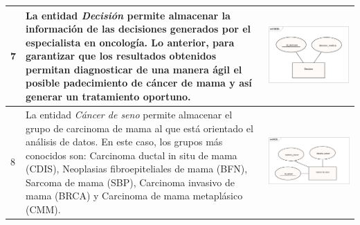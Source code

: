 \begin{table}[htb!]
\begin{threeparttable}
\begin{tabular}{p{0.5cm} p{7cm} p{7cm}}
			\\ \hline
			7
			& La entidad \textit{Decisión} permite almacenar la información de las decisiones generados por el especialista en oncología. Lo anterior, para garantizar que los resultados obtenidos permitan diagnosticar de una manera ágil el posible padecimiento de cáncer de mama y así generar un tratamiento oportuno.
			& \begin{center}\includegraphics[width=1\linewidth]{MER/IMAGENES_MER/7_DECISION}\end{center}
			\\ \hline
			8
			& La entidad \textit{Cáncer de seno} permite almacenar el grupo de carcinoma de mama al que está orientado el análisis de datos. En este caso, los grupos más conocidos son: Carcinoma ductal in situ de mama (CDIS), 
			Neoplasias fibroepiteliales de mama (BFN), Sarcoma de mama (SBP), Carcinoma invasivo de mama (BRCA) y Carcinoma de mama metaplásico (CMM).
			& \begin{center}\includegraphics[width=1\linewidth]{MER/IMAGENES_MER/8_CANCER}\end{center}
			\\ \hline
		\end{tabular}
	\end{threeparttable}
\end{table}

